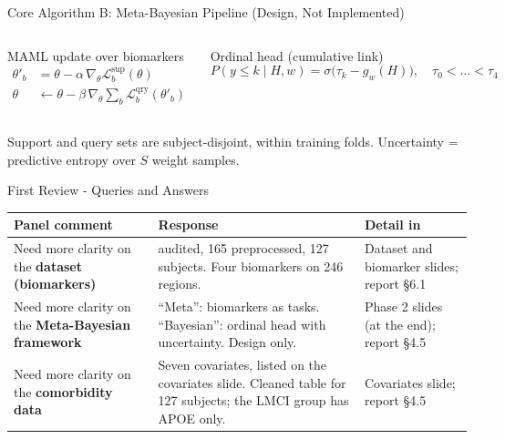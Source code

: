 \documentclass[aspectratio=169,11pt]{beamer}
\begin{document}
\begin{frame}{Core Algorithm B: Meta-Bayesian Pipeline (Design, Not Implemented)}
  \begin{columns}[T,onlytextwidth]
      \begin{block}{MAML update over biomarkers}
        \scriptsize
        \vspace{-4pt}
        \begin{align*}
          \theta'_b &= \theta-\alpha\,\nabla_\theta\mathcal{L}^{\mathrm{sup}}_b(\theta)\\
          \theta &\leftarrow \theta-\beta\,\nabla_\theta\sum_{b}\mathcal{L}^{\mathrm{qry}}_b(\theta'_b)
        \end{align*}
        \vspace{-8pt}
      \end{block}
      \begin{block}{Ordinal head (cumulative link)}
        \scriptsize
        \vspace{-4pt}
        \begin{equation*}
          P(y\le k\mid H,w)=\sigma\bigl(\tau_k-g_w(H)\bigr),\quad \tau_0<\dots<\tau_4
        \end{equation*}
        \vspace{-8pt}
      \end{block}
  \end{columns}
  {\scriptsize Support and query sets are subject-disjoint, within training folds.
  Uncertainty = predictive entropy over $S$ weight samples.}
\end{frame}

\begin{frame}{First Review - Queries and Answers}
  \small
  \begin{tabularx}{\textwidth}{>{\raggedright\arraybackslash}p{3.9cm}>{\raggedright\arraybackslash}X>{\raggedright\arraybackslash}p{2.8cm}}
    \toprule
    \textbf{Panel comment} & \textbf{Response} & \textbf{Detail in} \\
    \midrule
    Need more clarity on the \textbf{dataset (biomarkers)} &
    175 audited, 165 preprocessed, 127 subjects. Four biomarkers on 246 regions. &
    Dataset and biomarker slides; report \S6.1 \\[4pt]
    Need more clarity on the \textbf{Meta-Bayesian framework} &
    ``Meta'': biomarkers as tasks. ``Bayesian'': ordinal head with uncertainty.
    \alert{Design only.} &
    Phase 2 slides (at the end); report \S4.5 \\[4pt]
    Need more clarity on the \textbf{comorbidity data} &
    Seven covariates, listed on the covariates slide. Cleaned table for 127 subjects; the LMCI group has APOE only. &
    Covariates slide; report \S4.5 \\
    \bottomrule
  \end{tabularx}
\end{frame}
\end{document}
